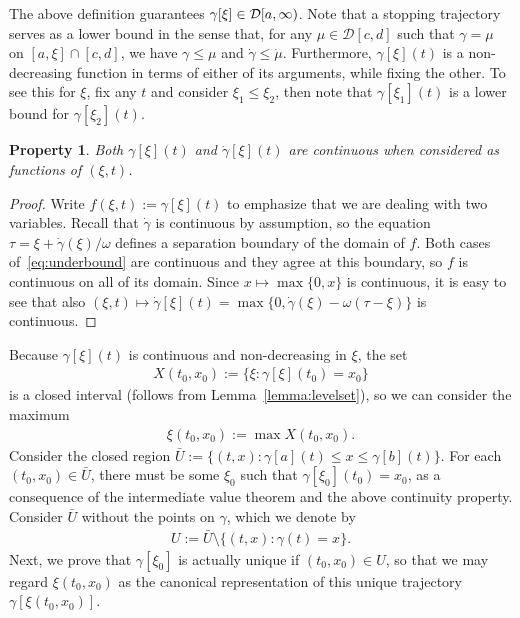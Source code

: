 \documentclass[a4paper]{article}
\theoremstyle{definition}
\theoremstyle{plain}
\newtheorem{property}{Property\hspace{0.25em}\ignorespaces}
\begin{document}
The above definition guarantees $\gamma[\xi] \in \mathcal{D}[a,\infty)$.
%
Note that a stopping trajectory serves as a lower bound in the sense that, for any
$\mu\in\mathcal{D}[c,d]$ such that $\gamma = \mu$ on $[a, \xi] \cap [c, d]$, we
have $\gamma \leq \mu$ and $\dot{\gamma} \leq \dot{\mu}$.
%
Furthermore, $\gamma[\xi](t)$ is a non-decreasing function in terms of either of its
arguments, while fixing the other. To see this for $\xi$, fix any $t$ and
consider $\xi_{1} \leq \xi_{2}$, then note that $\gamma[\xi_{1}](t)$ is a lower
bound for $\gamma[\xi_{2}](t)$.
%
\begin{property}
  Both $\gamma[\xi](t)$ and $\dot{\gamma}[\xi](t)$ are continuous when considered as functions
  of $(\xi, t)$.
\end{property}
\begin{proof}
  Write $f(\xi, t) := \gamma[\xi](t)$ to emphasize that we are dealing with two variables.
  Recall that $\dot{\gamma}$ is continuous by assumption, so the equation
  $\tau = \xi + \dot{\gamma}(\xi)/\omega$ defines a separation boundary of the
  domain of $f$. Both cases of~\eqref{eq:underbound} are continuous and they
  agree at this boundary, so $f$ is continuous on all of its domain.
  Since $x \mapsto \max\{0, x \}$ is continuous, it is easy to see that also
  $(\xi, t) \mapsto \dot{\gamma}[\xi](t) = \max\{0, \dot{\gamma}(\xi) - \omega (\tau - \xi) \}$
  is continuous.
\end{proof}

Because $\gamma[\xi](t)$ is continuous and non-decreasing in $\xi$, the set
\begin{align}\label{eq:X}
  X(t_{0}, x_{0}) := \{\xi : \gamma[\xi](t_{0}) = x_{0}\}
\end{align}
is a closed interval (follows from Lemma~\ref{lemma:levelset}), so we can consider the maximum
\begin{align}\label{eq:xi}
  \xi(t_{0}, x_{0}) := \max X(t_{0}, x_{0}) .
\end{align}
%
Consider the closed region $\bar{U} := \{ (t, x) : \gamma[a](t) \leq x \leq \gamma[b](t) \}$.
For each $(t_{0}, x_{0}) \in \bar{U}$, there must be some $\xi_{0}$ such that
$\gamma[\xi_{0}](t_{0}) = x_{0}$, as a consequence of the intermediate value theorem and the
above continuity property.
%
Consider $\bar{U}$ without the points on $\gamma$, which we denote by
\begin{align}\label{eq:U}
  U := \bar{U} \setminus \{ (t,x) : \gamma(t) = x\}.
\end{align}
Next, we prove that $\gamma[\xi_{0}]$ is actually unique if $(t_{0}, x_{0}) \in U$, so that we
may regard $\xi(t_{0}, x_{0})$ as the canonical representation of this unique
trajectory $\gamma[\xi(t_{0}, x_{0})]$.
\end{document}
